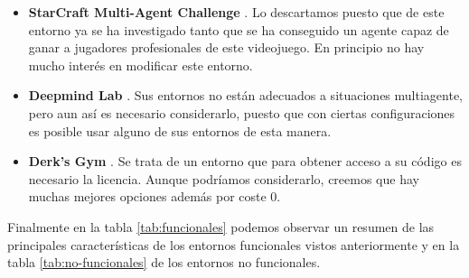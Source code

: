 \begin{itemize}
	\item \textbf{StarCraft Multi-Agent Challenge} \cite{starcraft-repo}. Lo descartamos puesto que de este entorno ya se ha investigado tanto que se ha conseguido un agente capaz de ganar a jugadores profesionales de este videojuego. En principio no hay mucho interés en modificar este entorno.

	\item \textbf{Deepmind Lab} \cite{deepmind-repo}. Sus entornos no están adecuados a situaciones multiagente, pero aun así es necesario considerarlo, puesto que con ciertas configuraciones es posible usar alguno de sus entornos de esta manera.

	\item \textbf{Derk's Gym} \cite{derk-repo}. Se trata de un entorno que para obtener acceso a su código es necesario la licencia. Aunque podríamos considerarlo, creemos que hay muchas mejores opciones además por coste 0.

\end{itemize}

Finalmente en la tabla \ref{tab:funcionales} podemos observar un resumen de las principales características de los entornos funcionales vistos anteriormente y en la tabla \ref{tab:no-funcionales} de los entornos no funcionales.

